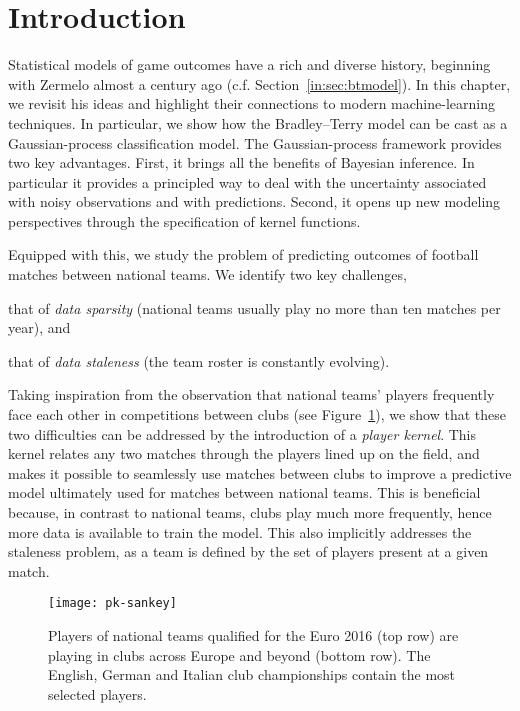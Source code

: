 \section{Introduction}
\label{pk:sec:intro}


Statistical models of game outcomes have a rich and diverse history, beginning with Zermelo almost a century ago (c.f. Section~\ref{in:sec:btmodel}).
In this chapter, we revisit his ideas and highlight their connections to modern machine-learning techniques.
In particular, we show how the Bradley--Terry model can be cast as a Gaussian-process classification model.
The Gaussian-process framework provides two key advantages.
First, it brings all the benefits of Bayesian inference.
In particular it provides a principled way to deal with the uncertainty associated with noisy observations and with predictions.
Second, it opens up new modeling perspectives through the specification of kernel functions.

Equipped with this, we study the problem of predicting outcomes of football matches between national teams.
We identify two key challenges,
\begin{enuminline}
\item that of \emph{data sparsity} (national teams usually play no more than ten matches per year), and
\item that of \emph{data staleness} (the team roster is constantly evolving).
\end{enuminline}
Taking inspiration from the observation that national teams' players frequently face each other in competitions between clubs (see Figure~\ref{pk:fig:sankey}), we show that these two difficulties can be addressed by the introduction of a \emph{player kernel}.
This kernel relates any two matches through the players lined up on the field, and makes it possible to seamlessly use matches between clubs to improve a predictive model ultimately used for matches between national teams.
This is beneficial because, in contrast to national teams, clubs play much more frequently, hence more data is available to train the model.
This also implicitly addresses the staleness problem, as a team is defined by the set of players present at a given match.

\begin{figure}
  \centering
  \texttt{[image: pk-sankey]}
  \caption{
  Players of national teams qualified for the Euro 2016 (top row) are playing in clubs across Europe and beyond (bottom row).
  The English, German and Italian club championships contain the most selected players.
}
  \label{pk:fig:sankey}
\end{figure}

